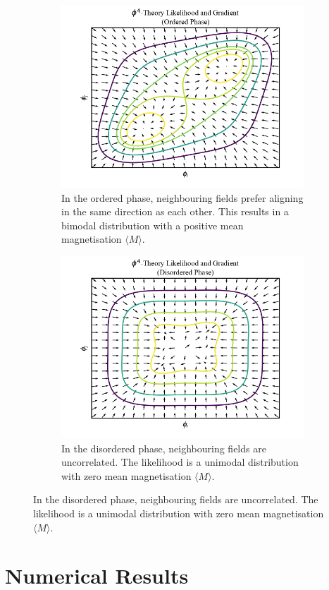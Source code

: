 \documentclass[11pt]{article}
\begin{document}
    \begin{figure}[t!]
        \centering
        \begin{subfigure}{\linewidth}
            \centering
            \includegraphics[width=\linewidth]{../figures/Phi4LikelihoodOrdered}
            \caption{
            In the ordered phase, neighbouring fields prefer aligning in the same direction as each other.
            This results in a bimodal distribution with a positive mean magnetisation $\langle M \rangle$.}
            \label{fig:phi4likelihood_ordered}
        \end{subfigure}
        \begin{subfigure}{\linewidth}
            \centering
            \includegraphics[width=\linewidth]{../figures/Phi4LikelihoodDisordered}
            \caption{
            In the disordered phase, neighbouring fields are uncorrelated. The likelihood is a unimodal distribution
            with zero mean magnetisation $\langle M \rangle$.}
            \label{fig:phi4likelihood_disordered}
        \end{subfigure}
    \end{figure}

    \section{Numerical Results}\label{sec:numerical_results}
\end{document}
